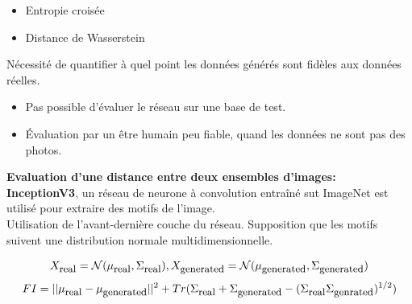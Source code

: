 \documentclass[a0,portrait]{a0poster}
\newcommand{\equtext}[1]{\mbox{\small{#1}}}
\begin{document}
\begin{multicols}{2}
\begin{tcolorbox}[colback=blue!5!white,colframe=blue!75!black,title={\section*{Différents types de GAN}}]
\begin{itemize}
    \item Entropie croisée
    \item Distance de Wasserstein
\end{itemize}
\end{tcolorbox}
\bigskip

\begin{tcolorbox}[colback=blue!5!lime,colframe=green!75!black,title={\section*{Mesurer les performances d'un GAN?}}]
Nécessité de quantifier à quel point les données générés sont fidèles aux données réelles.
\begin{itemize}
    \item Pas possible d'évaluer le réseau sur une base de test.
    \item Évaluation par un être humain peu fiable, quand les données ne sont pas des photos.
\end{itemize}
\end{tcolorbox}
\bigskip


\begin{tcolorbox}[colback=blue!5!white,colframe=blue!75!black,title={\section*{FID (Fréchet Inception Distance)}}]
\textbf{Evaluation d'une distance entre deux ensembles d'images:}\\
\textbf{InceptionV3}, un réseau de neurone à convolution entraîné sut ImageNet est utilisé pour extraire des motifs de l'image.\\
Utilisation de l'avant-dernière couche du réseau.
Supposition que les motifs suivent une distribution normale multidimensionnelle.
\begin{center}
$$X_{\equtext{real}}=\mathcal{N}(\mu_{\equtext{real}}, \Sigma_{\equtext{real}}), X_{\equtext{generated}}=\mathcal{N}(\mu_{\equtext{generated}}, \Sigma_{\equtext{generated}})$$
$$FI = ||\mu_{\equtext{real}} - \mu_{\equtext{generated}}||^2 + Tr(\Sigma_{\equtext{real}} + \Sigma_{\equtext{generated}}  - (\Sigma_{\equtext{real}} \Sigma_{\equtext{genrated}})^{1/2})$$
\end{center}
\end{tcolorbox}
\bigskip


\end{multicols}
\end{document}
